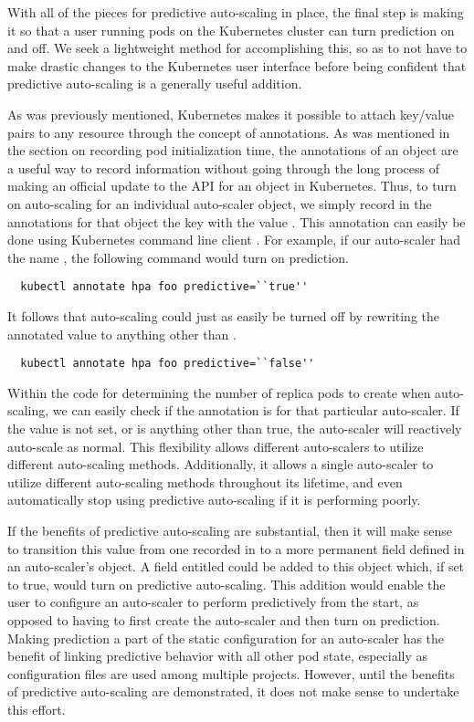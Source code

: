 With all of the pieces for predictive auto-scaling in place, the final step is
making it so that a user running pods on the Kubernetes cluster can turn
prediction on and off. We seek a lightweight method for accomplishing this, so
as to not have to make drastic changes to the Kubernetes user interface before
being confident that predictive auto-scaling is a generally useful addition.

As was previously mentioned, Kubernetes makes it
possible to attach key/value pairs to any
resource through the concept of annotations. As was mentioned in the section on
recording pod initialization time, the annotations of an object are a useful way
to record information without going through the long process of making an
official update to the API for an object in Kubernetes. Thus, to turn on
auto-scaling for an individual auto-scaler object, we simply record in the annotations for
that object the key  with the value . This
annotation can easily be done using Kubernetes command line
client \cite{k8s-kubectl-annotate}. For example,
if our auto-scaler had the name , the following command would turn
on prediction.

\begin{verbatim}
  kubectl annotate hpa foo predictive=``true''
\end{verbatim}

It follows that auto-scaling could just as easily be turned off by rewriting the
annotated value to anything other than .

\begin{verbatim}
  kubectl annotate hpa foo predictive=``false''
\end{verbatim}

Within the code for determining the number of replica pods to create when
auto-scaling, we can easily check if the  annotation is
 for that particular auto-scaler. If the value is not set, or
is anything other than true, the auto-scaler will reactively auto-scale as normal.
This flexibility allows different auto-scalers to utilize different auto-scaling
methods. Additionally, it allows a single auto-scaler to utilize different
auto-scaling methods throughout its lifetime, and even automatically stop using
predictive auto-scaling if it is performing poorly.

If the benefits of predictive auto-scaling are substantial, then it will make
sense to transition this value from one recorded in  to a
more permanent field defined in an auto-scaler's
 object. A field entitled
 could be added to this object which, if set to true, would
turn on predictive auto-scaling. This addition would enable the user to
configure an
auto-scaler to perform predictively from the start, as opposed to having to first
create the auto-scaler and then turn on prediction. Making prediction a part of
the static configuration for an auto-scaler has the benefit of linking predictive
behavior with all other pod state, especially as configuration files are used
among multiple projects. However, until the benefits of predictive
auto-scaling are demonstrated, it does not make sense to undertake this effort.
